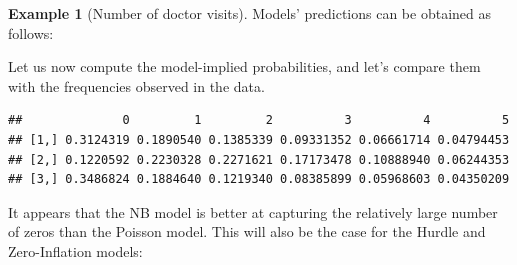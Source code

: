 \documentclass[
  12pt,
]{book}
\newenvironment{Shaded}{\begin{snugshade}}{\end{snugshade}}
\newcommand{\AttributeTok}[1]{\textcolor[rgb]{0.77,0.63,0.00}{#1}}
\newcommand{\CommentTok}[1]{\textcolor[rgb]{0.56,0.35,0.01}{\textit{#1}}}
\newcommand{\DecValTok}[1]{\textcolor[rgb]{0.00,0.00,0.81}{#1}}
\newcommand{\FunctionTok}[1]{\textcolor[rgb]{0.00,0.00,0.00}{#1}}
\newcommand{\NormalTok}[1]{#1}
\newcommand{\OtherTok}[1]{\textcolor[rgb]{0.56,0.35,0.01}{#1}}
\newcommand{\SpecialCharTok}[1]{\textcolor[rgb]{0.00,0.00,0.00}{#1}}
\newcommand{\StringTok}[1]{\textcolor[rgb]{0.31,0.60,0.02}{#1}}
\theoremstyle{definition}
\theoremstyle{definition}
\newtheorem{example}{Example}[chapter]
\theoremstyle{definition}
\theoremstyle{definition}
\theoremstyle{remark}
\begin{document}
\begin{example}[Number of doctor visits]
Models' predictions can be obtained as follows:

\begin{Shaded}
\end{Shaded}

Let us now compute the model-implied probabilities, and let's compare them with the frequencies observed in the data.

\begin{Shaded}
\end{Shaded}

\begin{verbatim}
##              0         1         2          3          4          5
## [1,] 0.3124319 0.1890540 0.1385339 0.09331352 0.06661714 0.04794453
## [2,] 0.1220592 0.2230328 0.2271621 0.17173478 0.10888940 0.06244353
## [3,] 0.3486824 0.1884640 0.1219340 0.08385899 0.05968603 0.04350209
\end{verbatim}

It appears that the NB model is better at capturing the relatively large number of zeros than the Poisson model. This will also be the case for the Hurdle and Zero-Inflation models:
\end{example}
\end{document}
